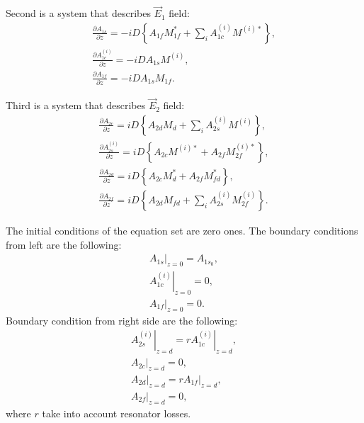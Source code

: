 Second is a system that describes $\vec E_1$ field:
\begin{eqnarray}
\frac{\partial{A_{1s}}}{\partial{z}} = 
- i D \left\{ 
 A_{1f} M_{1f}^\ast + \sum_i A_{1c}^{(i)}M^{(i)\ast}\right\},
\nonumber \\
\frac{\partial{A_{1c}^{(i)}}}{\partial{z}} = - 
i D A_{1s} M^{(i)},
\nonumber \\
\frac{\partial{A_{1f}}}{\partial{z}} = 
- i D A_{1s} M_{1f}.
\label{eqAmpl_left_gen}
\end{eqnarray}

Third is a system that describes $\vec E_2$ field:
\begin{eqnarray}
\frac{\partial{A_{2c}}}{\partial{z}} = 
i D \left\{ 
 A_{2d} M_d + \sum_i A_{2s}^{(i)} M^{(i)} \right\},
\nonumber \\
\frac{\partial{A_{2s}^{(i)}}}{\partial{z}} = 
i D \left\{
A_{2c} M^{(i)\ast}
+
A_{2f} M_{2f}^{(i)\ast}
\right\}, 
\nonumber \\
\frac{\partial{A_{2d}}}{\partial{z}} = 
i D \left\{
A_{2c} M_d^\ast
+
A_{2f} M_{fd}^\ast
\right\},
\nonumber \\
\frac{\partial{A_{2f}}}{\partial{z}} = 
i D  \left\{ 
 A_{2d} M_{fd} + \sum_i A_{2s}^{(i)} M_{2f}^{(i)} \right\}.
\label{eqAmpl_right_gen}
\end{eqnarray}

The initial conditions of the equation set are zero ones. The
boundary conditions from left are the following:
\begin{eqnarray}
\left. A_{1s} \right|_{z=0} = A_{1s_0},
\nonumber \\
\left. A_{1c}^{(i)} \right|_{z=0} = 0,
\nonumber \\
\left. A_{1f} \right|_{z=0} = 0.
\label{eqBoundary_left_gen}
\end{eqnarray}
Boundary condition from right side are the following:
\begin{eqnarray}
\left. A_{2s}^{(i)} \right|_{z=d} = r \left. A_{1c}^{(i)} \right|_{z=d},
\nonumber \\ 
\left. A_{2c} \right|_{z=d} = 0,
\nonumber \\ 
\left. A_{2d} \right|_{z=d} = r \left. A_{1f} \right|_{z=d},
\nonumber \\ 
\left. A_{2f} \right|_{z=d} = 0,
\label{eqBoundary_right_gen}
\end{eqnarray}
where $r$ take into account resonator losses.


